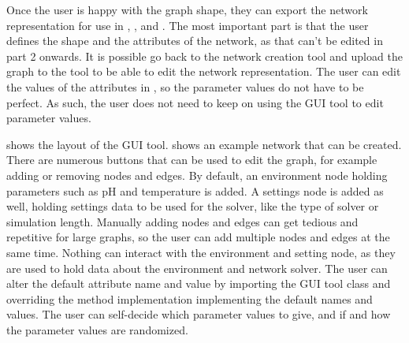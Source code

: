 Once the user is happy with the graph shape, they can export the network representation for use in , , and . 
The most important part is that the user defines the shape and the attributes of the network, as that can't be edited in part 2 onwards. 
It is possible go back to the network creation tool and upload the graph to the tool to be able to edit the network representation. \newline
The user can edit the values of the attributes in , so the parameter values do not have to be perfect. 
As such, the user does not need to keep on using the GUI tool to edit parameter values. 

 shows the layout of the GUI tool.  shows an example network that can be created.
There are numerous buttons that can be used to edit the graph, for example adding or removing nodes and edges. 
By default, an environment node holding parameters such as pH and temperature is added.
A settings node is added as well, holding settings data to be used for the solver, like the type of solver or simulation length.
Manually adding nodes and edges can get tedious and repetitive for large graphs, so the user can add multiple nodes and edges at the same time.
Nothing can interact with the environment and setting node, as they are used to hold data about the environment and network solver.
The user can alter the default attribute name and value by importing the GUI tool class and overriding the method implementation implementing the default names and values. 
The user can self-decide which parameter values to give, and if and how the parameter values are randomized. 

